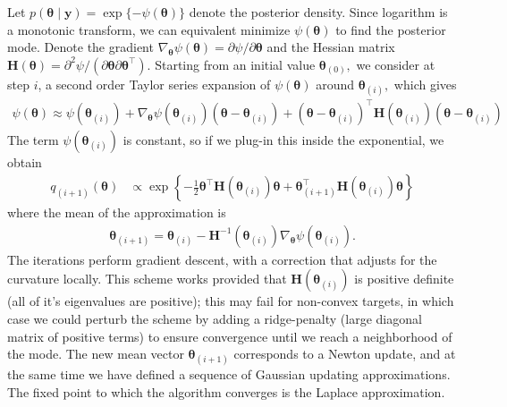 \documentclass[
  11pt,
  letterpaper,
]{scrbook}
\theoremstyle{definition}
\theoremstyle{plain}
\theoremstyle{plain}
\theoremstyle{plain}
\theoremstyle{definition}
\theoremstyle{definition}
\theoremstyle{plain}
\theoremstyle{plain}
\theoremstyle{remark}
\begin{document}
Let
\(p(\boldsymbol{\theta} \mid \boldsymbol{y})=\exp\{-\psi(\boldsymbol{\theta})\}\)
denote the posterior density. Since logarithm is a monotonic transform,
we can equivalent minimize \(\psi(\boldsymbol{\theta})\) to find the
posterior mode. Denote the gradient
\(\nabla_{\boldsymbol{\theta}} \psi(\boldsymbol{\theta}) = \partial \psi/\partial \boldsymbol{\theta}\)
and the Hessian matrix
\(\mathbf{H}(\boldsymbol{\theta}) = \partial^2 \psi/(\partial \boldsymbol{\theta}\partial \boldsymbol{\theta}^\top).\)
Starting from an initial value \(\boldsymbol{\theta}_{(0)},\) we
consider at step \(i\), a second order Taylor series expansion of
\(\psi(\boldsymbol{\theta})\) around \(\boldsymbol{\theta}_{(i)},\)
which gives \begin{align*}
 \psi(\boldsymbol{\theta}) \approx \psi(\boldsymbol{\theta}_{(i)}) + \nabla_{\boldsymbol{\theta}} \psi(\boldsymbol{\theta}_{(i)})(\boldsymbol{\theta}-\boldsymbol{\theta}_{(i)}) + (\boldsymbol{\theta}-\boldsymbol{\theta}_{(i)})^\top\mathbf{H}(\boldsymbol{\theta}_{(i)})(\boldsymbol{\theta}-\boldsymbol{\theta}_{(i)})
\end{align*} The term \(\psi(\boldsymbol{\theta}_{(i)})\) is constant,
so if we plug-in this inside the exponential, we obtain \begin{align*}
 q_{(i+1)}(\boldsymbol{\theta}) &\propto \exp \left\{ - \frac{1}{2} \boldsymbol{\theta}^\top\mathbf{H}(\boldsymbol{\theta}_{(i)}) \boldsymbol{\theta} + \boldsymbol{\theta}_{(i+1)}^\top\mathbf{H}(\boldsymbol{\theta}_{(i)})\boldsymbol{\theta}\right\}
 \end{align*} where the mean of the approximation is \begin{align*}
 \boldsymbol{\theta}_{(i+1)} = \boldsymbol{\theta}_{(i)} - \mathbf{H}^{-1}(\boldsymbol{\theta}_{(i)}) \nabla_{\boldsymbol{\theta}} \psi(\boldsymbol{\theta}_{(i)}).
\end{align*} The iterations perform gradient descent, with a correction
that adjusts for the curvature locally. This scheme works provided that
\(\mathbf{H}(\boldsymbol{\theta}_{(i)})\) is positive definite (all of
it's eigenvalues are positive); this may fail for non-convex targets, in
which case we could perturb the scheme by adding a ridge-penalty (large
diagonal matrix of positive terms) to ensure convergence until we reach
a neighborhood of the mode. The new mean vector
\(\boldsymbol{\theta}_{(i+1)}\) corresponds to a Newton update, and at
the same time we have defined a sequence of Gaussian updating
approximations. The fixed point to which the algorithm converges is the
Laplace approximation.
\end{document}
